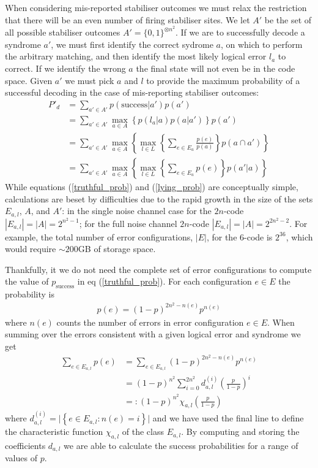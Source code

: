 When considering mis-reported stabiliser outcomes we must relax the restriction that there will be an even number of firing stabiliser sites. We let $A'$ be the set of all possible stabiliser outcomes $A' = \{0, 1\}^{\otimes n^2}$. If we are to successfully decode a syndrome $a'$, we must first identify the correct sydrome $a$, on which to perform the arbitrary matching, and then identify the most likely logical error $l_a$ to correct. If we identify the wrong $a$ the final state will not even be in the code space. Given $a'$ we must pick $a$ and $l$ to provide the maximum probability of a successful decoding in the case of mis-reporting stabiliser outcomes:
\begin{align}
  P'_d &= \sum_{a' \in A'} p(\text{success} \vert a') p(a') \\
  &= \sum_{a'\in A'} \max_{a \in A} \left\{ p(l_a \vert a) p(a \vert a') \right\} p(a')\\
  &= \sum_{a'\in A'} \max_{a \in A} \left\{ \max_{l \in L} \left\{\sum_{e \in E_a} \frac{p(e)}{p(a)} \right\} p(a \cap a') \right\}\\
  &= \sum_{a'\in A'} \max_{a \in A} \left\{ \max_{l \in L} \left\{\sum_{e \in E_a} p(e) \right\} p(a' \vert a) \right\} \label{lying_prob}
\end{align}
While equations (\ref{truthful_prob}) and (\ref{lying_prob}) are conceptually simple, calculations are beset by difficulties due to the rapid growth in the size of the sets $E_{a,l}$, $A$, and $A'$: in the single noise channel case for the $2n$-code $|E_{a,l}| = |A| = 2^{n^2-1}$; for the full noise channel $2n$-code $|E_{a,l}| = |A| = 2^{2n^2 - 2}$. For example, the total number of error configurations, $|E|$, for the $6$-code is $2^{36}$, which would require $\sim200$GB of storage space.

Thankfully, it we do not need the complete set of error configurations to compute the value of $p_\text{success}$ in eq (\ref{truthful_prob}). For each configuration $e\in E$ the probability is
\begin{align}
  p(e) = (1-p)^{2n^2 - n(e)} p^{n(e)}
\end{align}
where $n(e)$ counts the number of errors in error configuration $e \in E$. When summing over the errors consistent with a given logical error and syndrome we get
\begin{align}
  \sum_{e \in E_{a,l}} p(e) &= \sum_{e \in E_{a,l}} (1-p)^{2n^2 - n(e)} p^{n(e)} \\
  &= (1-p)^{n^2} \sum_{i = 0}^{2n^2} d_{a,l}^{(i)} \left(\frac{p}{1-p}\right)^i \\
  &=: (1-p)^{n^2} \chi_{a,l}\left(\frac{p}{1-p}\right)
\end{align}
where $d_{a,l}^{(i)} = \vert \left\{e \in E_{a,l} : n(e)=i \right\} \vert$ and we have used the final line to define the characteristic function $\chi_{a,l}$ of the class $E_{a,l}$. By computing and storing the coefficients $d_{a,l}$ we are able to calculate the success probabilities for a range of values of $p$.

